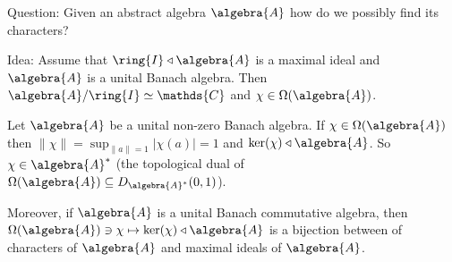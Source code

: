\documentclass[a4paper]{article}
\begin{document}
Question: Given an abstract algebra $\algebra{A}$ how do we possibly find its characters?

Idea: Assume that $\ring{I} \triangleleft \algebra{A}$ is a maximal ideal and $\algebra{A}$ is a unital Banach algebra.
Then $\algebra{A} / \ring{I} \simeq \mathds{C}$ and $\chi \in \Omega(\algebra{A})$.

\begin{theorem}
	Let $\algebra{A}$ be a unital non-zero Banach algebra.
	If $\chi \in \Omega(\algebra{A})$ then $\| \chi \| = \sup_{\|a\| = 1} |\chi(a)| = 1$ and $\ker(\chi) \triangleleft \algebra{A}$.
	So $\chi \in \algebra{A}^*$ (the topological dual of $\Omega(\algebra{A}) \subseteq D_{\algebra{A}^*}(0,1)$).

	Moreover, if $\algebra{A}$ is a unital Banach commutative algebra, then $\Omega(\algebra{A}) \ni \chi \mapsto \ker(\chi) \triangleleft \algebra{A}$ is a bijection between of characters of $\algebra{A}$ and maximal ideals of $\algebra{A}$.
\end{theorem}
\end{document}
